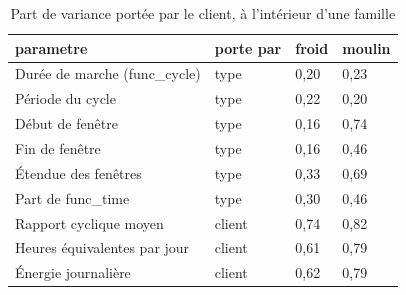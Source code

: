 \begin{table}[htbp]
\caption{Part de variance portée par le client, à l'intérieur d'une famille}
\label{tab:transfert_variance}
\begin{tabular}{llll}
\toprule
parametre & porte par & froid & moulin \\
\midrule
Durée de marche (func\_cycle) & type & 0,20 & 0,23 \\
Période du cycle & type & 0,22 & 0,20 \\
Début de fenêtre & type & 0,16 & 0,74 \\
Fin de fenêtre & type & 0,16 & 0,46 \\
Étendue des fenêtres & type & 0,33 & 0,69 \\
Part de func\_time & type & 0,30 & 0,46 \\
Rapport cyclique moyen & client & 0,74 & 0,82 \\
Heures équivalentes par jour & client & 0,61 & 0,79 \\
Énergie journalière & client & 0,62 & 0,79 \\
\bottomrule
\end{tabular}
\end{table}
